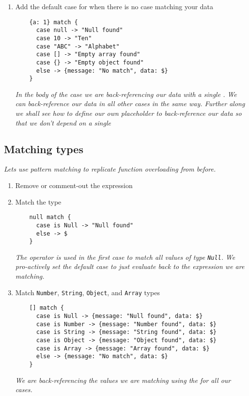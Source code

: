 \begin{enumerate}
\begin{verbatim}
      case "ABC" -> "Alphabet"
      case [] -> "Empty array found"
      case {} -> "Empty object found"
    }
  \end{verbatim}
  \emph{
    We are getting errors because there is no case matching this expression.
  }
  \newline
  \emph{
    There is no way to match inner data of objects and arrays directly in a case--i.e. adding inner data at the case level will only result in syntax errors.
  }
\item Add the default case for when there is no case matching your data
  \begin{verbatim}
    {a: 1} match {
      case null -> "Null found"
      case 10 -> "Ten"
      case "ABC" -> "Alphabet"
      case [] -> "Empty array found"
      case {} -> "Empty object found"
      else -> {message: "No match", data: $}
    }
  \end{verbatim}
  \emph{
    In the body of the  case we are back-referencing our data with a single \ttt{\$}.  We can back-reference our data in all other cases in the same way.  Further along we shall see how to define our own placeholder to back-reference our data so that we don't depend on a single \ttt{\$}
  }
\end{enumerate}

\subsection{Matching types}
\emph{
  Lets use pattern matching to replicate function overloading from before.
}
\begin{enumerate}[resume*]
\item Remove or comment-out the expression
\item Match the  type
  \begin{verbatim}
    null match {
      case is Null -> "Null found"
      else -> $
    }
  \end{verbatim}
  \emph{
    The  operator is used in the first case to match all values of type \lstinline{Null}.
  }
  \newline
  \emph{
    We pro-actively set the default case to just evaluate back to the expression we are matching.
  }
\item Match \lstinline{Number}, \lstinline{String}, \lstinline{Object}, and \lstinline{Array} types
  \begin{verbatim}
    [] match {
      case is Null -> {message: "Null found", data: $}
      case is Number -> {message: "Number found", data: $}
      case is String -> {message: "String found", data: $}
      case is Object -> {message: "Object found", data: $}
      case is Array -> {message: "Array found", data: $}
      else -> {message: "No match", data: $}
    }
  \end{verbatim}
  \emph{
    We are back-referencing the values we are matching using the \ttt{\$} for all our cases.
  }
\end{enumerate}

